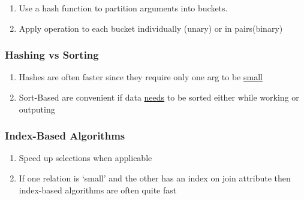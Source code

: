 \documentclass[11pt]{article}
\begin{document}
\begin{enumerate}
\item Use a hash function to partition arguments into buckets.
\item Apply operation to each bucket individually (unary) or in
      pairs(binary)
\end{enumerate}
\subsubsection{Hashing vs Sorting}
\label{sec-12.5.3}

\begin{enumerate}
\item Hashes are often faster since they require only one arg to be \underline{small}
\item Sort-Based are convenient if data \underline{needs} to be sorted either
       while working or outputing
\end{enumerate}
\subsubsection{Index-Based Algorithms}
\label{sec-12.5.4}

\begin{enumerate}
\item Speed up selections when applicable
\item If one relation is `small' and the other has an index on join
      attribute then index-based algorithms are often quite fast
\end{enumerate}
\end{document}
